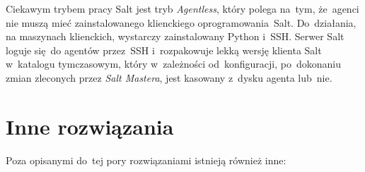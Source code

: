 \documentclass[thesis]{subfiles}
\begin{document}
Ciekawym trybem pracy Salt jest tryb \emph{Agentless}, który polega na~tym, że~agenci nie muszą mieć zainstalowanego klienckiego oprogramowania~Salt. Do~działania, na maszynach klienckich, wystarczy zainstalowany Python i~SSH. Serwer Salt loguje się~do agentów przez~SSH i~rozpakowuje lekką wersję klienta Salt w~katalogu tymczasowym, który w~zależności od~konfiguracji, po~dokonaniu zmian zleconych przez \emph{Salt Mastera}, jest kasowany z~dysku agenta lub~nie.


\section{Inne rozwiązania}

Poza opisanymi do~tej pory rozwiązaniami istnieją również inne:\mynobreakpar
\end{document}
